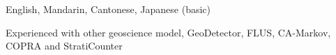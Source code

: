 

\begin{cvskills}


    {English, Mandarin, Cantonese, Japanese (basic)}

    { Experienced with other geoscience model, GeoDetector, FLUS, CA-Markov, COPRA and StratiCounter }


\end{cvskills}
